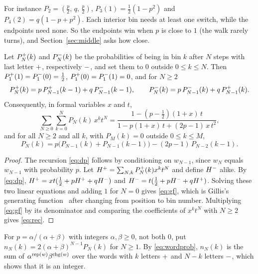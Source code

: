For instance $P_2=(\tfrac p2,\,q,\,\tfrac p2)$, $P_3(1)=\tfrac12(1-p^2)$ and
$P_4(2)=q(1-p+p^2)$. Each interior bin needs at least one switch, while the
endpoints need none. So the endpoints win when $p$ is close to $1$ (the walk
rarely turns), and
Section~\ref{sec:middle} asks how close.

\begin{proposition}\label{prop:gf}
Let $P_N^{\mathord{+}}(k)$ and $P_N^{\mathord{-}}(k)$ be the probabilities of being in bin $k$
after $N$ steps with last letter $\mathord{+}$, respectively $\mathord{-}$, and set them to $0$
outside $0\le k\le N$. Then $P_1^{\mathord{+}}(1)=P_1^{\mathord{-}}(0)=\tfrac12$,
$P_1^{\mathord{+}}(0)=P_1^{\mathord{-}}(1)=0$, and for $N\ge2$
\begin{equation}\label{eq:dp}
P_N^{\mathord{+}}(k)=p\,P_{N-1}^{\mathord{+}}(k-1)+q\,P_{N-1}^{\mathord{-}}(k-1),\qquad
P_N^{\mathord{-}}(k)=p\,P_{N-1}^{\mathord{-}}(k)+q\,P_{N-1}^{\mathord{+}}(k).
\end{equation}
Consequently, in formal variables $x$ and $t$,
\begin{equation}\label{eq:gf}
\sum_{N\ge0}\sum_{k=0}^{N}P_N(k)\,x^kt^N=\frac{1-(p-\tfrac12)(1+x)\,t}{1-p(1+x)\,t+(2p-1)\,x\,t^2},
\end{equation}
and for all $N\ge2$ and all $k$, with $P_M(k)=0$ outside $0\le k\le M$,
\begin{equation}\label{eq:rec}
P_N(k)=p\bigl(P_{N-1}(k)+P_{N-1}(k-1)\bigr)-(2p-1)\,P_{N-2}(k-1).
\end{equation}
\end{proposition}

\begin{proof}
The recursion \eqref{eq:dp} follows by conditioning on $w_{N-1}$, since $w_N$
equals $w_{N-1}$ with probability $p$.
Let $H^{\mathord{+}}=\sum_{N,k}P_N^{\mathord{+}}(k)x^kt^N$ and define $H^{\mathord{-}}$ alike. By
\eqref{eq:dp}, $H^{\mathord{+}}=xt(\tfrac12+pH^{\mathord{+}}+qH^{\mathord{-}})$ and
$H^{\mathord{-}}=t(\tfrac12+pH^{\mathord{-}}+qH^{\mathord{+}})$. Solving these two linear equations
and adding $1$ for $N=0$ gives \eqref{eq:gf}, which is Gillis's generating
function~\cite[Eq.~(3.1)]{gillis1955} after changing from position to bin number. Multiplying
\eqref{eq:gf} by its denominator and comparing the coefficients of $x^kt^N$
with $N\ge2$ gives \eqref{eq:rec}.
\end{proof}

\begin{remark}\label{rem:tables}
For $p=\alpha/(\alpha+\beta)$ with integers $\alpha,\beta\ge0$, not both $0$,
put $n_N(k)=2(\alpha+\beta)^{N-1}P_N(k)$ for $N\ge1$. By
\eqref{eq:wordprob}, $n_N(k)$ is the sum of $\alpha^{\operatorname{rep}(w)}\beta^{\operatorname{chg}(w)}$
over the words with $k$ letters $\mathord{+}$ and $N-k$ letters $\mathord{-}$, which shows that
it is an integer.
\end{remark}

